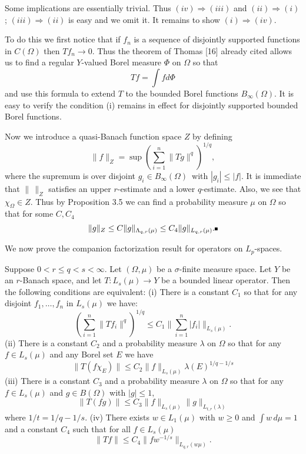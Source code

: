 Some implications are essentially trivial.  Thus
$(iv)\Rightarrow (iii)$ and $(ii)\Rightarrow (i)$; $(iii)\Rightarrow
(ii)$ is easy and we omit it.  It remains to show $(i)\Rightarrow (iv).$
 
To do this we first notice that if $f_n$ is a sequence of disjointly
supported functions in $C(\Omega)$ then $Tf_n\to 0.$ Thus the theorem of
Thomas [16] already cited allows us to find a regular $Y$-valued Borel
measure $\Phi$ on $\Omega$ so that $$Tf=\int fd\Phi$$ and use this
formula to extend $T$ to the bounded Borel functions
$B_{\infty}(\Omega).$ It is easy to verify the condition (i) remains in
effect for disjointly supported bounded Borel functions.
 
Now we introduce a quasi-Banach function space $Z$ by defining $$
\|f\|_Z = \sup \left(\sum_{i=1}^n \|Tg\|^q \right)^{1/q} ,$$ where the
supremum is over disjoint $g_i \in B_{\infty}(\Omega)$\ with $|g_i|\le
|f|$.  It is immediate that $\|\,\|_Z$ satisfies an upper $r$-estimate
and a lower $q$-estimate.  Also, we see that $\chi_\Omega \in Z$.  Thus
by Proposition 3.5 we can find a probability measure $\mu$ on $\Omega$
so that for some $C,C_4$ $$ \|g\|_Z \le C \|g\|_{\Lambda_{q,r}(\mu)}\le
C_4\|g\|_{L_{q,r}(\mu)}.\bull$$ \enddemo
 
We now prove the companion factorization result for operators on
$L_p$-spaces.
 
 
Suppose $0<r\le q< s< \infty.$ Let $(\Omega,\mu)$
be a
$\sigma$-finite measure space.  Let $Y$ be an $r$-Banach
space, and let $T:L_s(\mu)\to Y$ be a bounded linear operator.  Then the
following conditions are equivalent:  \newline (i) There is a constant
$C_1$ so that for any disjoint $f_1,\ldots,f_n$ in $L_s(\mu)$ we have:
$$
(\sum_{i=1}^n \|Tf_i\|^q)^{1/q} \le C_1
\|\sum_{i=1}^n|f_i|\|_{L_s(\mu)}.$$
\newline (ii) There is a constant $C_2$ and a probability measure
$\lambda$ on $\Omega$ so that for any $f\in L_s(\mu)$ and any Borel set
$E$
we have $$ \|T(f\chi_E)\| \le C_2 \|f\|_{L_s(\mu)} \lambda(E)^{1/q-1/s}$$
\newline (iii) There is a constant $C_3$ and a probability measure
$\lambda$ on $\Omega$ so that for any $f\in L_s(\mu)$ and $g\in
B(\Omega)$ with
$|g|\le 1,$ $$ \|T(fg)\| \le C_3 \|f\|_{L_s(\mu)}
\|g\|_{L_{t,r}(\lambda)}$$ where $1/t=1/q-1/s.$ \newline (iv) There
exists $w\in L_1(\mu)$ with $w\ge 0$ and $\int w\,d\mu=1$ and a constant
$C_4$ such that for all $f\in L_s(\mu)$ $$ \|Tf\| \le C_4
\|fw^{-1/s}\|_{L_{q,r}(w\mu)} .$$ \endproclaim
 
